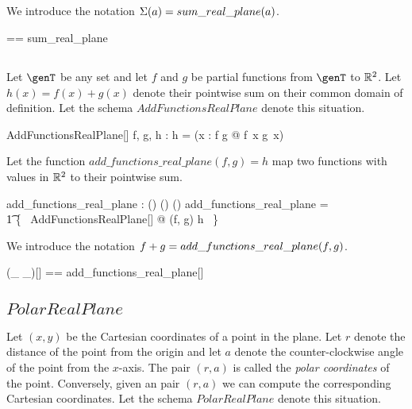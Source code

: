 \documentclass{amsart}
\begin{document}
\subsection{}

We introduce the notation $\Sigma(a) = sum\_real\_plane(a)$.

\begin{zed}
	\sumRtwo == sum\_real\_plane
\end{zed}

\subsection{}

Let $\genT$ be any set and let $f$ and $g$ be partial functions from $\genT$ to $\mathbb{R}^2$.
Let $h(x) = f(x) + g(x)$ denote their pointwise sum on their common domain of definition.
Let the schema $AddFunctionsRealPlane$ denote this situation.

\begin{schema}{AddFunctionsRealPlane}[\genT]
	f, g, h : \genT \pfun \Rtwo
\where
	h = (\lambda x : \dom f \cap \dom g @ f~x \addRtwo g~x)
\end{schema}

Let the function $add\_functions\_real\_plane(f, g) = h$ map two functions with values in $\mathbb{R}^2$ to their pointwise sum.

\begin{gendef}[\genT]
	add\_functions\_real\_plane : (\genT \pfun \Rtwo) \cross (\genT \pfun \Rtwo) \fun (\genT \pfun \Rtwo)
\where
	add\_functions\_real\_plane = \\
	\t1	\{~ AddFunctionsRealPlane[\genT] @ (f, g) \mapsto h ~\}
\end{gendef}

We introduce the notation $f \mathbin{+} g = add\_functions\_real\_plane(f, g)$.

\begin{zed}
	(\_ \addFRtwo \_)[\genT] == add\_functions\_real\_plane[\genT]
\end{zed}


\subsection{$PolarRealPlane$}

Let $(x, y)$ be the Cartesian coordinates of a point in the plane.
Let $r$ denote the distance of the point from the origin and
let $a$ denote the counter-clockwise angle of the point from the $x$-axis.
The pair $(r, a)$ is called the \textit{polar coordinates} of the point.
Conversely, given an pair $(r, a)$ we can compute the corresponding
Cartesian coordinates.
Let the schema $PolarRealPlane$ denote this situation.
\end{document}
